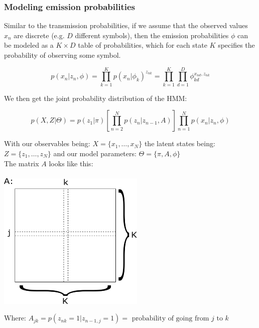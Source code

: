     \subsubsection{Modeling emission probabilities}
    Similar to the transmission probabilities, if we assume that the observed 
    values $x_n$ are discrete (e.g. $D$ different symbols), then the emission 
    probabilities $\phi$ can be modeled as a $K\times D$ table of 
    probabilities, which for each state $K$ specifies the probability of 
    observing some symbol.
    
    \begin{equation*}
        p(x_n|z_n,\phi)=\prod_{k=1}^K p(x_n|\phi_k)^{z_{nk}}
        = \prod_{k=1}^K \prod_{d=1}^{D} \phi_{kd}^{x_{nd},z_{nk}}
    \end{equation*}
    
    We then get the joint probability distribution of the HMM:
    
    \begin{equation*}
        p(X,Z|\Theta) = 
        p(z_1|\pi)\left[\prod_{n=2}^{N}p(z_n|z_{n-1},A)\right] 
        \prod_{n=1}^{N}p(x_n|z_n,\phi)
    \end{equation*}
    
    With our observables being: $X=\{x_1,\dots,x_N\}$ the latent states being:
    $Z=\{z_1,\dots,z_N\}$ and our model parameters: $\Theta=\{\pi, A, \phi\}$
    \\
    The matrix $A$ looks like this:\\
    \\
    \includegraphics[width=7cm]{Figures/trans_prob_A.pdf}
    
    Where: $A_{jk}=p(z_{nk}=1|z_{n-1,j}=1)=\text{ probability of going from $j$ 
    to $k$}$

